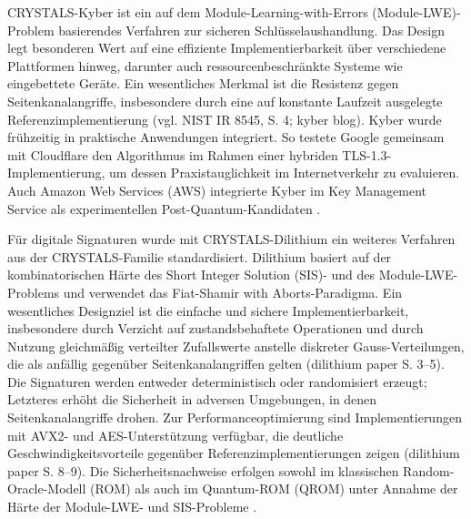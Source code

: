 CRYSTALS-Kyber ist ein auf dem Module-Learning-with-Errors (Module-LWE)-Problem basierendes Verfahren zur sicheren Schlüsselaushandlung. Das Design legt besonderen Wert auf eine effiziente Implementierbarkeit über verschiedene Plattformen hinweg, darunter auch ressourcenbeschränkte Systeme wie eingebettete Geräte. Ein wesentliches Merkmal ist die Resistenz gegen Seitenkanalangriffe, insbesondere durch eine auf konstante Laufzeit ausgelegte Referenzimplementierung (vgl. NIST IR 8545, S. 4; kyber blog). Kyber wurde frühzeitig in praktische Anwendungen integriert. So testete Google gemeinsam mit Cloudflare den Algorithmus im Rahmen einer hybriden TLS-1.3-Implementierung, um dessen Praxistauglichkeit im Internetverkehr zu evaluieren. Auch Amazon Web Services (AWS) integrierte Kyber im Key Management Service als experimentellen Post-Quantum-Kandidaten \cite{sullivan_securing_2020, weibel_round_2020}.

Für digitale Signaturen wurde mit CRYSTALS-Dilithium ein weiteres Verfahren aus der CRYSTALS-Familie standardisiert. Dilithium basiert auf der kombinatorischen Härte des Short Integer Solution (SIS)- und des Module-LWE-Problems und verwendet das Fiat-Shamir with Aborts-Paradigma. Ein wesentliches Designziel ist die einfache und sichere Implementierbarkeit, insbesondere durch Verzicht auf zustandsbehaftete Operationen und durch Nutzung gleichmäßig verteilter Zufallswerte anstelle diskreter Gauss-Verteilungen, die als anfällig gegenüber Seitenkanalangriffen gelten (dilithium paper S. 3–5). Die Signaturen werden entweder deterministisch oder randomisiert erzeugt; Letzteres erhöht die Sicherheit in adversen Umgebungen, in denen Seitenkanalangriffe drohen. Zur Performanceoptimierung sind Implementierungen mit AVX2- und AES-Unterstützung verfügbar, die deutliche Geschwindigkeitsvorteile gegenüber Referenzimplementierungen zeigen (dilithium paper S. 8–9). Die Sicherheitsnachweise erfolgen sowohl im klassischen Random-Oracle-Modell (ROM) als auch im Quantum-ROM (QROM) unter Annahme der Härte der Module-LWE- und SIS-Probleme \cite[S. 6-7]{schwabe_dilithium_nodate}.


